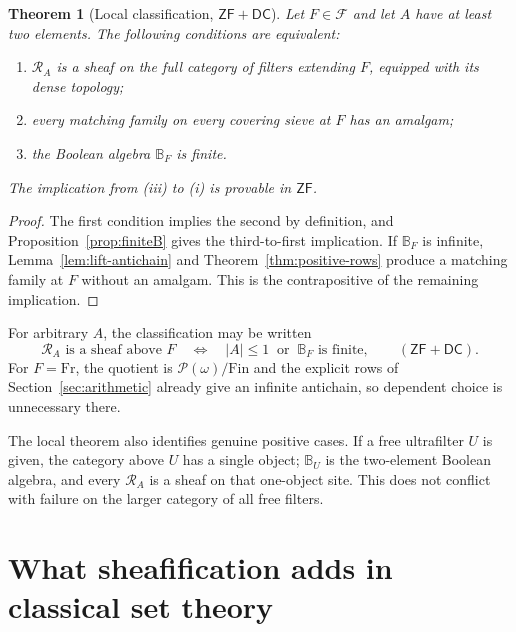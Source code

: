 \documentclass[11pt,letterpaper]{article}
\newtheorem{theorem}{Theorem}[section]
\theoremstyle{definition}
\theoremstyle{remark}
\newcommand{\om}{\omega}
\newcommand{\Fr}{\mathrm{Fr}}
\newcommand{\cF}{\mathcal F}
\newcommand{\RA}{\mathscr R_A}
\newcommand{\Pow}{\mathcal P}
\newcommand{\ZF}{\mathsf{ZF}}
\newcommand{\DC}{\mathsf{DC}}
\newcommand{\B}{\mathbb B}
\begin{document}
\begin{theorem}[Local classification, $\ZF+\DC$]\label{thm:local}
Let $F\in\cF$ and let $A$ have at least two elements. The following
conditions are equivalent:
\begin{enumerate}[label=\textup{(\roman*)}]
 \item $\RA$ is a sheaf on the full category of filters extending $F$,
       equipped with its dense topology;
 \item every matching family on every covering sieve at $F$ has an amalgam;
 \item the Boolean algebra $\B_F$ is finite.
\end{enumerate}
The implication from \textup{(iii)} to \textup{(i)} is provable in $\ZF$.
\end{theorem}
\begin{proof}
The first condition implies the second by definition, and
Proposition~\ref{prop:finiteB} gives the third-to-first implication.
If $\B_F$ is infinite, Lemma~\ref{lem:lift-antichain} and
Theorem~\ref{thm:positive-rows} produce a matching family at $F$
without an amalgam. This is the contrapositive of the remaining
implication.
\end{proof}

For arbitrary $A$, the classification may be written
\[
 \RA\text{ is a sheaf above }F
 \quad\Longleftrightarrow\quad
 |A|\leq1\ \text{ or }\ \B_F\text{ is finite},
 \qquad(\ZF+\DC).
\]
For $F=\Fr$, the quotient is $\Pow(\om)/\mathrm{Fin}$ and the
explicit rows of Section~\ref{sec:arithmetic} already give an infinite
antichain, so dependent choice is unnecessary there.

The local theorem also identifies genuine positive cases. If a free
ultrafilter $U$ is given, the category above $U$ has a single object;
$\B_U$ is the two-element Boolean algebra, and every $\RA$ is a
sheaf on that one-object site. This does not conflict with failure on the
larger category of all free filters.

\section{What sheafification adds in classical set theory}
\label{sec:sheafification}
\end{document}
